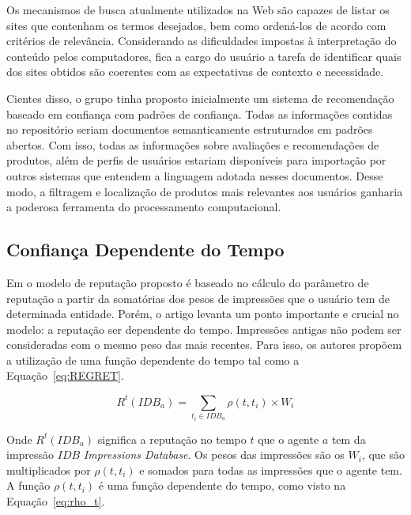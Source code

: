  Os mecanismos de busca atualmente utilizados na Web são capazes de listar os sites que contenham os termos desejados, bem como ordená-los de acordo com critérios de relevância. Considerando as dificuldades impostas à interpretação do conteúdo pelos computadores, fica a cargo do usuário a tarefa de identificar quais dos sites obtidos são coerentes com as expectativas de contexto e necessidade.

 Cientes disso, o grupo tinha proposto inicialmente um sistema de recomendação baseado em confiança com padrões de confiança. Todas as informações contidas no repositório seriam documentos semanticamente estruturados em padrões abertos. Com isso, todas as informações sobre avaliações e recomendações de produtos, além de perfis de usuários estariam disponíveis para importação por outros sistemas que entendem a linguagem adotada nesses documentos. Desse modo, a filtragem e localização de produtos mais relevantes aos usuários ganharia a poderosa ferramenta do processamento computacional.


\subsection{Confiança Dependente do Tempo} %
\label{sub:confianca_dependente_do_tempo}

 Em \cite{sabater2001regret} o modelo de reputação proposto é baseado no cálculo do parâmetro de reputação a partir da somatórias dos pesos de impressões que o usuário tem de determinada entidade. Porém, o artigo levanta um ponto importante e crucial no modelo: a reputação ser dependente do tempo. Impressões antigas não podem ser consideradas com o mesmo peso das mais recentes. Para isso, os autores propõem a utilização de uma função dependente do tempo tal como a Equação~\ref{eq:REGRET}.
 
\begin{equation}
 R^t(IDB_a) = {\sum_{t_i\in{IDB_a}}}\rho(t,t_i)\times{W_i}
 \label{eq:REGRET} 
\end{equation}

 Onde $R^t(IDB_a)$ significa a reputação no tempo $t$ que o agente $a$ tem da impressão $IDB$ \textit{Impressions Database}. Os pesos das impressões são os $W_i$, que são multiplicados por $\rho(t,t_i)$ e somados para todas as impressões que o agente tem. A função $\rho(t,t_i)$ é uma função dependente do tempo, como visto na Equação~\ref{eq:rho_t}.
 
